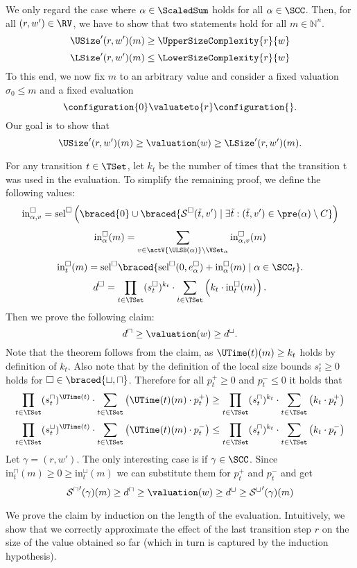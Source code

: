 We only regard the case where $\alpha \in \ScaledSum$ holds for all $\alpha \in \SCC$.
Then, for all $(r, w') \in \RV$, we have to show that two statements hold for all $m \in \mathbb{N}^n$.
\[ \USize'(r, w')(m) \geq \UpperSizeComplexity{r}{w} \]
\[ \LSize'(r, w')(m) \leq \LowerSizeComplexity{r}{w} \]
To this end, we now fix $m$ to an arbitrary value and consider a fixed valuation $\sigma_0 \leq m$ and a fixed evaluation
\[ \configuration{0} \valuateto{r} \configuration{}. \]
Our goal is to show that
\[ \USize'(r, w')(m) \geq \valuation(w) \geq \LSize'(r, w')(m). \]

For any transition $t \in \TSet$, let $k_t$ be the number of times that the transition t was used in the evaluation.
To simplify the remaining proof, we define the following values:
\[ \text{in}^\square_{\alpha,v} = \text{sel}^\square \left( \braced{0} \cup \braced{\mathcal{S}^\square(\tilde{t}, v') \mid \exists \tilde{t}: (\tilde{t}, v') \in \pre(\alpha) \setminus C} \right) \]
\[ \text{in}^\square_\alpha(m) = \sum_{v \in \actV{\ULSB(\alpha)} \setminus \VSet_\alpha} \text{in}^\square_{\alpha,v}(m) \]
\[ \text{in}^\square_t(m) = \text{sel}^\square \braced{\text{sel}^\square(0, e^{\square}_\alpha) + \text{in}^\square_\alpha(m) \mid \alpha \in \SCC_t }. \]
\[ d^\square = \prod_{t \in \TSet} (s^\square_t)^{k_t} \cdot \sum_{t \in \TSet} \left( k_t \cdot \text{in}^\square_t(m) \right). \]
Then we prove the following claim:
\[ d^\sqcap \geq \valuation(w) \geq d^\sqcup. \]
Note that the theorem follows from the claim, as $\UTime(t)(m) \geq k_t$ holds by definition of $k_t$.
Also note that by the definition of the local size bounds $s^\square_t \geq 0$ holds for $\square \in \braced{\sqcup, \sqcap}$.
Therefore for all $p^+_t \geq 0$ and $p^-_t \leq 0$ it holds that
\[ \prod_{t \in \TSet} (s^\sqcap_t)^{\UTime(t)} \cdot \sum_{t \in \TSet} \left( \UTime(t)(m) \cdot p^+_t \right) \geq \prod_{t \in \TSet} (s^\sqcap_t)^{k_t} \cdot \sum_{t \in \TSet} \left( k_t \cdot p^+_t \right) \]
\[ \prod_{t \in \TSet} (s^\sqcup_t)^{\UTime(t)} \cdot \sum_{t \in \TSet} \left( \UTime(t)(m) \cdot p^-_t \right) \leq \prod_{t \in \TSet} (s^\sqcap_t)^{k_t} \cdot \sum_{t \in \TSet} \left( k_t \cdot p^-_t \right) \]
Let $\gamma = (r, w')$.
The only interesting case is if $\gamma \in \SCC$.
Since $\text{in}^\sqcap_t(m) \geq 0 \geq \text{in}^\sqcup_t(m)$ we can substitute them for $p^+_t$ and $p^-_t$ and get
\[ {\mathcal{S}^\sqcap}'(\gamma)(m) \geq d^\sqcap \geq \valuation(w) \geq d^\sqcup \geq {\mathcal{S}^\sqcup}'(\gamma)(m) \]

We prove the claim by induction on the length of the evaluation.
Intuitively, we show that we correctly approximate the effect of the last transition step $r$ on the size of the value obtained so far (which in turn is captured by the induction hypothesis).


